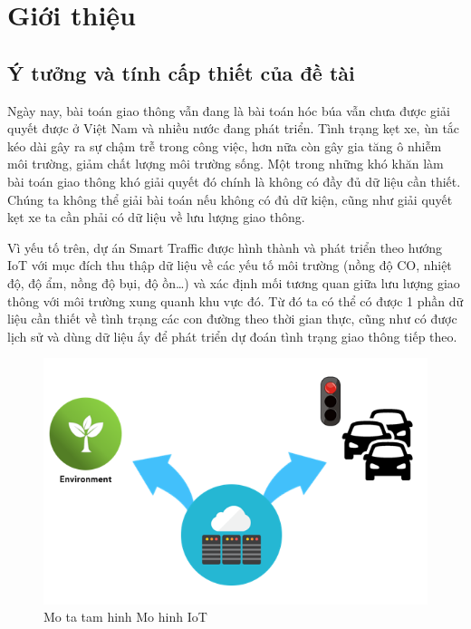 
\chapter{Giới thiệu}  %

\ifpdf
    \graphicspath{{Chapter1/Figs/Raster/}{Chapter1/Figs/PDF/}{Chapter1/Figs/}}
\else
    \graphicspath{{Chapter1/Figs/Vector/}{Chapter1/Figs/}}
\fi


\section{Ý tưởng và tính cấp thiết của đề tài} %
\label{section1.1}

Ngày nay, bài toán giao thông vẫn đang là bài toán hóc búa vẫn chưa được giải quyết được ở Việt Nam và nhiều nước đang phát triển. Tình trạng kẹt xe, ùn tắc kéo dài gây ra sự chậm trễ trong công việc, hơn nữa còn  gây gia tăng ô nhiễm môi trường, giảm chất lượng môi trường sống. Một trong những khó khăn làm bài toán giao thông khó giải quyết đó chính là không có đầy đủ dữ liệu cần thiết. Chúng ta không thể giải bài toán nếu không có đủ dữ kiện, cũng như giải quyết kẹt xe ta cần phải có dữ liệu về lưu lượng giao thông.

Vì yếu tố trên, dự án Smart Traffic được hình thành và phát triển theo hướng IoT với mục đích thu thập dữ liệu về các yếu tố môi trường (nồng độ CO, nhiệt độ, độ ẩm, nồng độ bụi, độ ồn…) và xác định mối tương quan giữa lưu lượng giao thông với môi trường xung quanh khu vực đó. Từ đó ta có thể có được 1 phần dữ liệu cần thiết về tình trạng các con đường theo thời gian thực, cũng như có được lịch sử và dùng dữ liệu ấy để phát triển dự đoán tình trạng giao thông tiếp theo.

\begin{figure}[htbp!] 
\centering    
\includegraphics[width=1.0\textwidth]{pic1}
\caption[Mo hinh IoT ]{Mo ta tam hinh Mo hinh IoT}
\label{fig:pic1}
\end{figure}

